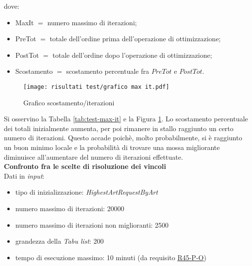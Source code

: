 \newpage
dove:
\begin{itemize}
    \item MaxIt $=$ numero massimo di iterazioni;
    \item PreTot $=$ totale dell'ordine prima dell'operazione di ottimizzazione;
    \item PostTot $=$ totale dell'ordine dopo l'operazione di ottimizzazione;
    \item Scostamento $=$ scostamento percentuale fra $PreTot$ e $PostTot$.
\end{itemize}
\begin{figure}[!h] 
    \centering
    \vspace*{0.2cm}
    \texttt{[image: risultati test/grafico max it.pdf]}
    \caption{Grafico scostamento/iterazioni}
    \label{grafico-scostamento-iterazioni}
\end{figure}
\noindent Si osservino la Tabella \ref{tab:test-max-it} e la Figura \ref{grafico-scostamento-iterazioni}.
\noindent Lo scostamento percentuale dei
totali inizialmente aumenta, per poi rimanere in stallo raggiunto un certo numero di iterazioni.
Questo accade poichè, molto probabilmente, si è raggiunto un buon minimo locale e la probabilità
di trovare una mossa migliorante diminuisce all'aumentare del numero di
iterazioni effettuate.\\[0.1cm]
\textbf{Confronto fra le scelte di risoluzione dei vincoli}\hfill\\[0.1cm]
Dati in \textit{input}:
\begin{itemize}
    \item tipo di inizializzazione: \textit{HighestArtRequestByArt}
    \item numero massimo di iterazioni: 20000
    \item numero massimo di iterazioni non miglioranti: 2500
    \item grandezza della \textit{Tabu list}: 200
    \item tempo di esecuzione massimo: 10 minuti (da requisito \hyperref[tab:requisiti-di-performance]{R45-P-O})
\end{itemize}

